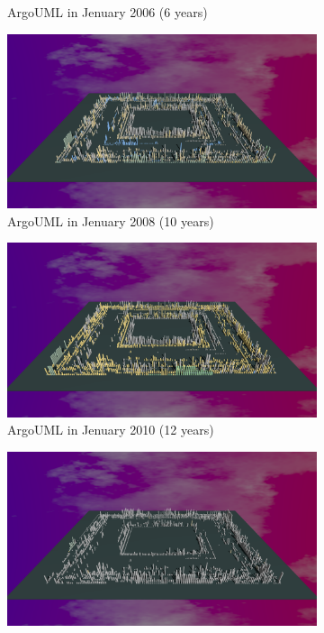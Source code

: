 \begin{figure}[h!]
\begin{subfigure}{0.48\textwidth}
        \caption{ArgoUML in Jenuary 2006 (6 years)} 
        \label{fig:ArgoUML_V3_S3}
    \end{subfigure}\hspace*{\fill}
    \begin{subfigure}{0.48\textwidth}
        \includegraphics[width=\linewidth]{ArgoUML/Animation010.png}
        \caption{ArgoUML in Jenuary 2008 (10 years)} 
        \label{fig:ArgoUML_V3_S4}
    \end{subfigure}
    \medskip
    \begin{subfigure}{0.48\textwidth}
        \includegraphics[width=\linewidth]{ArgoUML/Animation012.png}
        \caption{ArgoUML in Jenuary 2010 (12 years)} 
        \label{fig:ArgoUML_V3_S5}
    \end{subfigure}\hspace*{\fill}
    \begin{subfigure}{0.48\textwidth}
        \includegraphics[width=\linewidth]{ArgoUML/Animation022.png}

\end{subfigure}
\end{figure}
